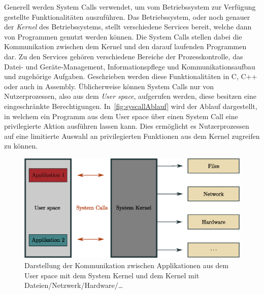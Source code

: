         Generell werden System Calls verwendet, um vom Betriebssystem zur Verfügung gestellte Funktionalitäten auszuführen.
        Das Betriebssystem, oder noch genauer der \textit{Kernel}  des Betriebssystems, stellt verschiedene Services bereit, welche dann von Programmen genutzt werden können. 
        Die System Calls stellen dabei die Kommunikation zwischen dem Kernel und den darauf laufenden Programmen dar.
        Zu den Services gehören verschiedene Bereiche der Prozesskontrolle, das Datei- und Geräte-Management, Informationspflege und Kommunikationsaufbau und zugehörige Aufgaben.
        Geschrieben werden diese Funktionalitäten in C, C++ oder auch in Assembly.
        Üblicherweise können System Calls nur von Nutzerprozessen, also aus dem \textit{User space}, aufgerufen werden, diese besitzen eine eingeschränkte Berechtigungen.
        In~\autoref{fig:syscallAblauf} wird der Ablauf dargestellt, in welchem ein Programm aus dem User space über einen System Call eine privilegierte Aktion ausführen lassen kann.
        Dies ermöglicht es Nutzerprozessen auf eine limitierte Auswahl an privilegierten Funktionen aus dem Kernel zugreifen zu können.~\cite{SYSCALL_SILBERSCHATZ}
    
        \begin{figure}[ht]
            \centering
            \includegraphics[width=1\textwidth]{images/Illustrationen/IDS/syscalls}
            \caption[Abstrahierte Darstellung eines System Calls innerhalb eines Computers]{Darstellung der Kommunikation zwischen Applikationen aus dem User space mit dem System Kernel und dem Kernel mit Dateien/Netzwerk/Hardware/\dots}
            \label{fig:syscallAblauf}
        \end{figure}


